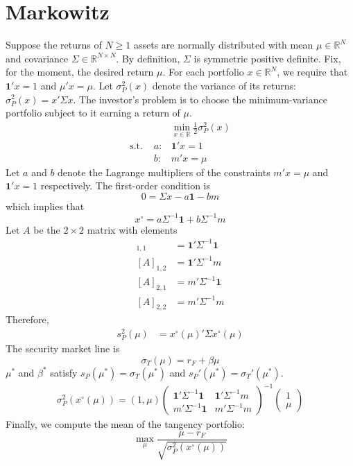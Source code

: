 \documentclass[12pt]{article}
\begin{document}
	\onehalfspacing
\section{Markowitz}
	Suppose the returns of $N\geq1$ assets are normally distributed with mean $\mu\in\mathbb{R}^{N}$ and covariance $\Sigma\in\mathbb{R}^{N\times N}$. By definition, $\Sigma$ is symmetric positive definite. Fix, for the moment, the desired return $\mu$. For each portfolio $x\in\mathbb{R}^{N}$, we require that $\mathbf{1}'x=1$ and $\mu'x=\mu$. Let $\sigma_{P}^{2}(x)$ denote the variance of its returns: $\sigma_{P}^{2}(x)=x'\Sigma x$. The investor's problem is to choose the minimum-variance portfolio subject to it earning a return of $\mu$. 
\begin{equation}
	\begin{array}{lrl}
		&&\min_{x\in\mathbb{R}}\frac{1}{2}\sigma_{P}^{2}(x)\\
		\text{s.t. }&a:&\mathbf{1}'x=1\\
		&b:&m'x=\mu
	\end{array}
\end{equation}
Let $a$ and $b$ denote the Lagrange multipliers of the constraints $m'x=\mu$ and $\mathbf{1}'x=1$ respectively. The first-order condition is
\begin{equation}
	0=\Sigma x-a\mathbf{1}-bm
\end{equation}
which implies that
\begin{equation}
	x^{\circ}=a\Sigma^{-1}\mathbf{1}+b\Sigma^{-1}m
\end{equation}
Let $A$ be the $2\times2$ matrix with elements 
\begin{align}
	[A]_{1,1}&=\mathbf{1}'\Sigma^{-1}\mathbf{1}\\
	[A]_{1,2}&=\mathbf{1}'\Sigma^{-1}m\\
	[A]_{2,1}&=m'\Sigma^{-1}\mathbf{1}\\
	[A]_{2,2}&=m'\Sigma^{-1}m
\end{align}
Therefore,
\begin{align}
	s_{P}^{2}(\mu)&=x^{\circ}(\mu)'\Sigma x^{\circ}(\mu)
\end{align}
The security market line is 
\begin{equation}
	\sigma_{T}(\mu)=r_F+\beta\mu
\end{equation}
$\mu^{*}$ and $\beta^{*}$ satisfy $s_{P}(\mu^{*})=\sigma_{T}(\mu^{*})$ and $s_{P}'(\mu^{*})=\sigma_{T}'(\mu^{*})$. 
\begin{align}
	\sigma_{P}^{2}(x^{\circ}(\mu))=
	(1,\mu)
	\left(
	\begin{array}{cc}
		\mathbf{1}'\Sigma^{-1}\mathbf{1} & \mathbf{1}'\Sigma^{-1}m\\
		m'\Sigma^{-1}\mathbf{1} & m'\Sigma^{-1}m
	\end{array}
	\right)^{-1}
	\left(
	\begin{array}{c}
		1\\
		\mu
	\end{array}
	\right)
\end{align}
Finally, we compute the mean of the tangency portfolio:
\begin{equation}
	\max_{\mu}\frac{\mu-r_{F}}{\sqrt{\sigma_{P}^{2}(x^{\circ}(\mu))}}
\end{equation}
\end{document}
